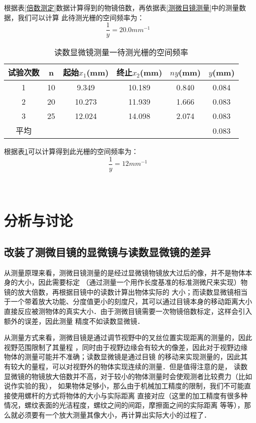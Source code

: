 		\par
		根据表\ref{倍数测定}数据计算得到的物镜倍数，再依据表\ref{测微目镜测量}中的测量数据，我们可以计算
		此待测光栅的空间频率为：
		$$\frac{1}{y} = 20.0mm^{-1}$$
		\begin{table}[ht]
			\centering
			\caption{读数显微镜测量一待测光栅的空间频率}
			\label{读数显微镜测量}
			\begin{tabular}{cccccc}
				\toprule
				试验次数 & n &起始$x_1$(mm) & 终止$x_2$(mm) & $ny$(mm) & $y$(mm)\\
				\midrule
				1 & 10 & 9.349 & 10.189 & 0.840 & 0.084\\
				2 & 20 & 10.273 & 11.939 & 1.666 & 0.083\\
				3 & 25 & 12.024 & 14.098 & 2.074 & 0.083\\
				平均 & & & & & 0.083\\
				\bottomrule
			\end{tabular}
		\end{table}
		\par
		根据表\ref{读数显微镜测量}可以计算得到此光栅的空间频率为：
		$$\frac{1}{y} = 12mm^{-1}$$\\
		\\
		\section{\Large{分析与讨论}}
			\subsection{改装了测微目镜的显微镜与读数显微镜的差异}
			\par
			从测量原理来看，测微目镜测量的是经过显微镜物镜放大过后的像，并不是物体本身的大小，因此需要标定
			（通过测量一个用作长度基准的标准测微尺来实现）物镜的放大倍数，再根据目镜中的读数计算出物体实际的
			大小；而读数显微镜相当于一个带着放大功能、分度值更小的刻度尺，其可以通过目镜本身的移动距离大小
			直接反应被测物体的真实大小．由于测微目镜需要一次物镜倍数标定，这样会引入额外的误差，因此测量
			精度不如读数显微镜．
			\par
			从测量方式来看，测微目镜是通过调节视野中的叉丝位置实现距离的测量的，因此视野范围限制了其量程
			，同时由于视野边缘会有较大的像差，因此对于视野边缘物体的测量可能并不准确；读数显微镜是通过目镜
			的移动来实现测量的，因此其有较大的量程，可以对视野外的物体实现连续的测量．但是值得注意的是，
			读数显微镜的物镜放大倍数并不高，对于较小的物体测量时会使观测者比较费力（比如说作实验的我），
			如果物体足够小，那么由于机械加工精度的限制，我们不可能直接使用螺杆的方式将物体的大小与实际距离
			直接对应（这里的加工精度有很多种情况，螺纹表面的光洁程度，螺纹之间的间距，摩擦面之间的实际距离
			等等），那么就必须要有一个放大测量其像大小，再计算出实际大小的过程了．
